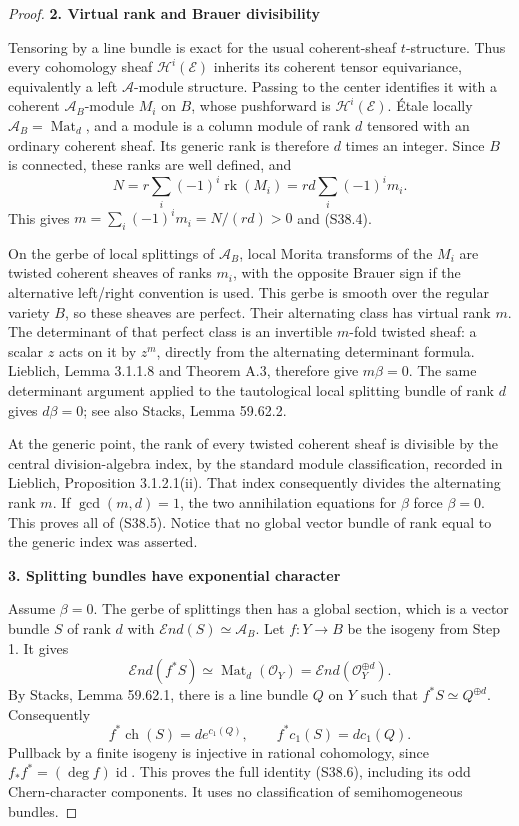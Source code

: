 \documentclass[11pt,a4paper]{article}
\theoremstyle{definition}
\begin{document}
\begin{proof}
\par

\medskip\noindent\textbf{2. Virtual rank and Brauer divisibility}\quad

Tensoring by a line bundle is exact for the usual coherent-sheaf \(t\)-structure. Thus every cohomology sheaf \(\mathcal H^i(\mathcal E)\) inherits its coherent tensor equivariance, equivalently a left \(\mathscr A\)-module structure. Passing to the center identifies it with a coherent \(\mathscr A_B\)-module \(M_i\) on \(B\), whose pushforward is \(\mathcal H^i(\mathcal E)\). Étale locally \(\mathscr A_B=\operatorname{Mat}_d\), and a module is a column module of rank \(d\) tensored with an ordinary coherent sheaf. Its generic rank is therefore \(d\) times an integer. Since \(B\) is connected, these ranks are well defined, and \[
 N=r\sum_i(-1)^i\operatorname{rk}(M_i)
   =rd\sum_i(-1)^i m_i.
\] This gives \(m=\sum_i(-1)^im_i=N/(rd)>0\) and (S38.4).

On the gerbe of local splittings of \(\mathscr A_B\), local Morita transforms of the \(M_i\) are twisted coherent sheaves of ranks \(m_i\), with the opposite Brauer sign if the alternative left/right convention is used. This gerbe is smooth over the regular variety \(B\), so these sheaves are perfect. Their alternating class has virtual rank \(m\). The determinant of that perfect class is an invertible \(m\)-fold twisted sheaf: a scalar \(z\) acts on it by \(z^m\), directly from the alternating determinant formula. Lieblich, Lemma 3.1.1.8 and Theorem A.3, therefore give \(m\beta=0\). The same determinant argument applied to the tautological local splitting bundle of rank \(d\) gives \(d\beta=0\); see also Stacks, Lemma 59.62.2.

At the generic point, the rank of every twisted coherent sheaf is divisible by the central division-algebra index, by the standard module classification, recorded in Lieblich, Proposition 3.1.2.1(ii). That index consequently divides the alternating rank \(m\). If \(\gcd(m,d)=1\), the two annihilation equations for \(\beta\) force \(\beta=0\). This proves all of (S38.5). Notice that no global vector bundle of rank equal to the generic index was asserted.

\par

\medskip\noindent\textbf{3. Splitting bundles have exponential character}\quad

Assume \(\beta=0\). The gerbe of splittings then has a global section, which is a vector bundle \(S\) of rank \(d\) with \(\mathcal End(S)\simeq\mathscr A_B\). Let \(f:Y\to B\) be the isogeny from Step 1. It gives \[
 \mathcal End(f^*S)\simeq\operatorname{Mat}_d(\mathcal O_Y)
                      =\mathcal End(\mathcal O_Y^{\oplus d}).
\] By Stacks, Lemma 59.62.1, there is a line bundle \(Q\) on \(Y\) such that \(f^*S\simeq Q^{\oplus d}\). Consequently \[
 f^*\operatorname{ch}(S)=d e^{c_1(Q)},\qquad
 f^*c_1(S)=d c_1(Q).
\] Pullback by a finite isogeny is injective in rational cohomology, since \(f_*f^*=(\deg f)\operatorname{id}\). This proves the full identity (S38.6), including its odd Chern-character components. It uses no classification of semihomogeneous bundles.


\end{proof}
\end{document}
